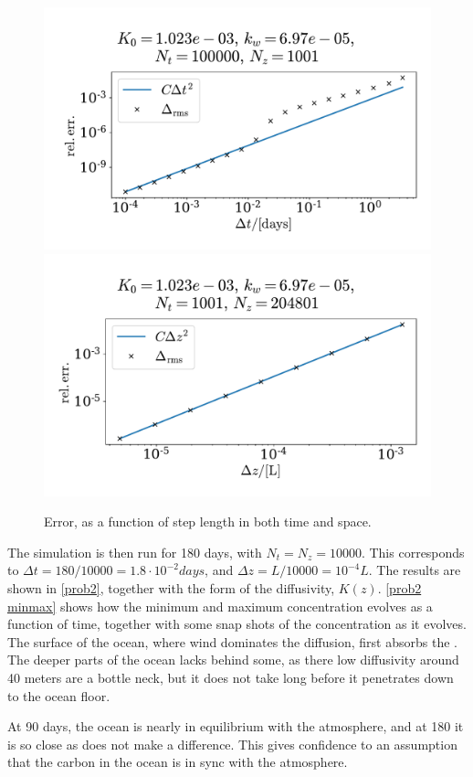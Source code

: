 \documentclass{article}
\begin{document}
    \begin{figure}[h]
        \centering
        \includegraphics[width=.49\textwidth]{../plots/prob2_conv_test_t}
        \includegraphics[width=.49\textwidth]{../plots/prob2_conv_test_z}
        \caption{Error, as a function of step length in both time and space.}
        \label{prob2 conv}
    \end{figure}

    The simulation is then run for 180 days, with $N_t = N_z = 10000$. This corresponds to $\Delta t = 180 / 10000 = 1.8 \cdot 10^{-2} \si{days}$, and $\Delta z = L/10000 = 10^{-4} L$. The results are shown in \autoref{prob2}, together with the form of the diffusivity, $K(z)$. \autoref{prob2 minmax} shows how the minimum and maximum concentration evolves as a function of time, together with some snap shots of the concentration as it evolves. The surface of the ocean, where wind dominates the diffusion, first absorbs the . The deeper parts of the ocean lacks behind some, as there low diffusivity around 40 meters are a bottle neck, but it does not take long before it penetrates down to the ocean floor.

    At 90 days, the ocean is nearly in equilibrium with the atmosphere, and at 180 it is so close as does not make a difference. This gives confidence to an assumption that the carbon in the ocean is in sync with the atmosphere.
\end{document}
